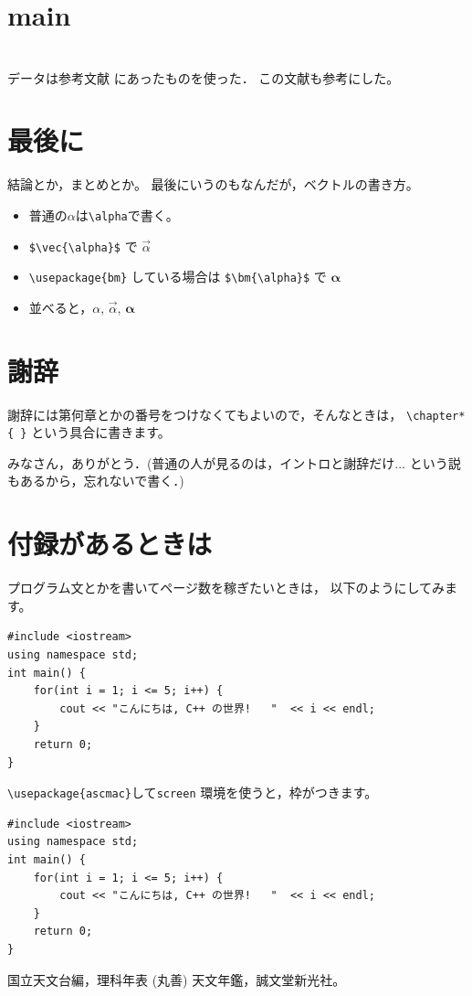 \documentclass[a4paper,12pt]{jsreport}
\theoremstyle{definition}
\begin{document}
\chapter{main}









\chapter{}
データは参考文献\cite{rika} にあったものを使った．
この文献\cite{ten}も参考にした。


\chapter{最後に}

結論とか，まとめとか。
最後にいうのもなんだが，ベクトルの書き方。
\begin{itemize}
  \item 普通の$\alpha$は\verb|\alpha|で書く。
  \item \verb|$\vec{\alpha}$| で $\vec{\alpha}$
  \item \verb|\usepackage{bm}| している場合は
        \verb|$\bm{\alpha}$| で $\bm{\alpha}$
  \item 並べると，$\alpha$, $\vec{\alpha}$, $\bm{\alpha}$
\end{itemize}


\chapter*{謝辞}

謝辞には第何章とかの番号をつけなくてもよいので，そんなときは，
\verb|\chapter*{ }| という具合に書きます。

みなさん，ありがとう．(普通の人が見るのは，イントロと謝辞だけ... 
という説もあるから，忘れないで書く．)

\appendix
\chapter{付録があるときは}
プログラム文とかを書いてページ数を稼ぎたいときは，
以下のようにしてみます。

\begin{verbatim}
#include <iostream>
using namespace std;
int main() {  
    for(int i = 1; i <= 5; i++) {
        cout << "こんにちは, C++ の世界!   "  << i << endl;
    }
    return 0;
}
\end{verbatim}
\verb|\usepackage{ascmac}|して\verb|screen| 環境を使うと，枠がつきます。
\begin{screen}
\begin{verbatim}
#include <iostream>
using namespace std;
int main() {  
    for(int i = 1; i <= 5; i++) {
        cout << "こんにちは, C++ の世界!   "  << i << endl;
    }
    return 0;
}
\end{verbatim}
\end{screen}

\begin{thebibliography}{99}
 国立天文台編，理科年表 (丸善)
 天文年鑑，誠文堂新光社。
\end{thebibliography}
\end{document}
